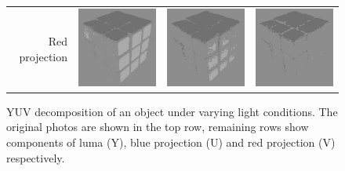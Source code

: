 \begin{figure}
\begin{tabular}{rccc}
         Red projection &
         \includegraphics[width=\rubiklength]{img/rubik/1_yuv_v.jpg} & 
         \includegraphics[width=\rubiklength]{img/rubik/2_yuv_v.jpg} & \includegraphics[width=\rubiklength]{img/rubik/3_yuv_v.jpg}
         \end{tabular}
    \caption[YUV decomposition of an object under varying light conditions]{YUV decomposition of an object under varying light conditions. The original photos are shown in the top row, remaining rows show components of luma (Y), blue projection (U) and red projection (V) respectively.}
    \label{fig:rubik_yuv}
\end{figure}

